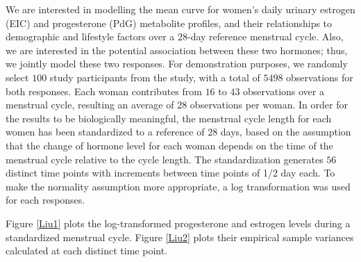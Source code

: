 \documentclass[12pt, notitlepage]{article}
\begin{document}
We are interested in modelling the mean curve for women's daily urinary estrogen (EIC) and progesterone (PdG) metabolite profiles, and their relationships to demographic and lifestyle factors over a $28$-day reference menstrual cycle. Also, we are interested in the potential association between these two hormones; thus, we jointly model these two responses. 
For demonstration purposes, we randomly select  $100$ study participants from the study, with a total of $5498$ observations for both responses. 
Each woman contributes from $16$ to $43$ observations over a menstrual cycle, resulting an average of $28$ observations per woman.
In order for the results to be biologically meaningful, the menstrual cycle length for each women has been standardized to a reference of $28$ days, based on the assumption that the change of hormone level for each woman depends on the time of the menstrual cycle relative to the cycle length. The standardization generates $56$ distinct time points with increments between time points of 1/2 day each. To make the normality assumption more appropriate, a log transformation was used for each responses. 

Figure \ref{Liu1} plots the log-transformed progesterone and estrogen levels during a standardized menstrual cycle. Figure \ref{Liu2} plots their empirical sample variances calculated at each distinct time point. 


%
%
\end{document}
